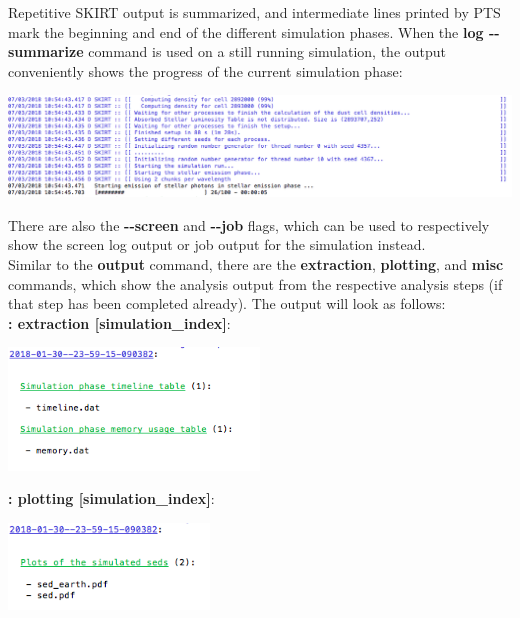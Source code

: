 \documentclass[15pt,a4paper,oneside,openright]{report}
\begin{document}
Repetitive SKIRT output is summarized, and intermediate lines printed by PTS mark the beginning and end of the different simulation phases. When the \textbf{log -{}-summarize} command is used on a still running simulation, the output conveniently shows the progress of the current simulation phase:

\begin{center}
\includegraphics[width=\textwidth]{figures/partial_log.png}
\end{center}

There are also the \textbf{-{}-screen} and \textbf{-{}-job} flags, which can be used to respectively show the screen log output or job output for the simulation instead.\\

Similar to the \textbf{output} command, there are the \textbf{extraction}, \textbf{plotting}, and \textbf{misc} commands, which show the analysis output from the respective analysis steps (if that step has been completed already). The output will look as follows:\\

\textbf{: extraction [simulation\_index]}:\\

\begin{center}
\includegraphics[width=0.5\textwidth]{figures/extraction.png}
\end{center}

\textbf{: plotting [simulation\_index]}:\\

\begin{center}
\includegraphics[width=0.4\textwidth]{figures/plotting.png}
\end{center}
\end{document}
